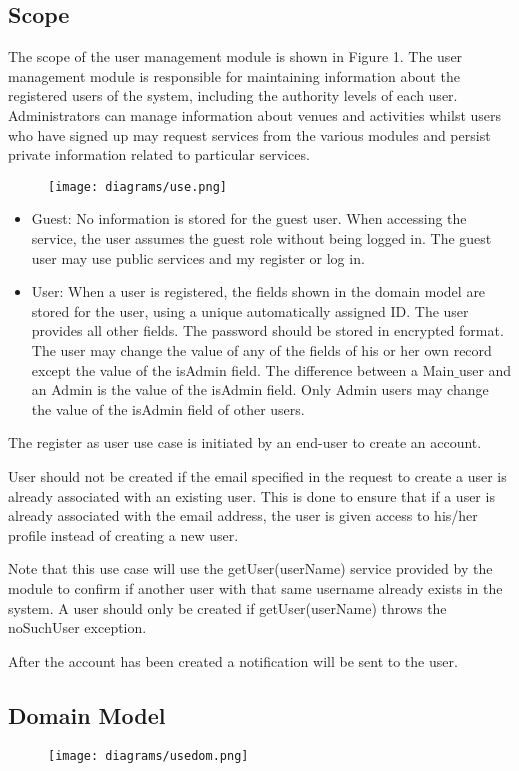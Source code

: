 \documentclass[12pt]{article}
\begin{document}
\subsection{Scope}
The scope of the user management module is shown in Figure 1. The user management module is responsible for maintaining information about the registered users of the system, including the authority levels of each user. Administrators can manage information about venues and activities whilst users who have signed up may request services from the various modules and persist private information related to particular  services.
\begin{figure}[h]
\centering
\texttt{[image: diagrams/use.png]}
\end{figure}
\begin{itemize}
\item Guest: No information is stored for the guest user. When accessing the service, the user assumes the guest role without being logged in. The guest user may use public services and my register or log in.
\item User: When a user is registered, the fields shown in the domain model are stored for the user, using a unique automatically assigned ID. The user provides all other fields. The password should be stored in encrypted format. The user may change the value of any of the fields of his or her own record except the value of the isAdmin field.  The  difference between a Main$\_$user and an Admin is the value of the isAdmin field. Only Admin users may change the value of the isAdmin field of other users.

\end{itemize}

The register as user  use case is initiated by an end-user to create an account. 

User should not be created if the email specified in the request to create a user is already associated with an existing user. This is done to ensure that if a user is already associated with the email address, the user is given access to his/her profile instead of creating a new user.

Note that this use case will use the getUser(userName) service provided by the module to conﬁrm if another user with that same username already exists in the system. A user should only be created if getUser(userName)  throws the noSuchUser exception.  

After the account has been created a notiﬁcation will be sent to the user.
\subsection{Domain Model}
\begin{figure}[h]
\centering
\texttt{[image: diagrams/usedom.png]}
\end{figure}
\end{document}
